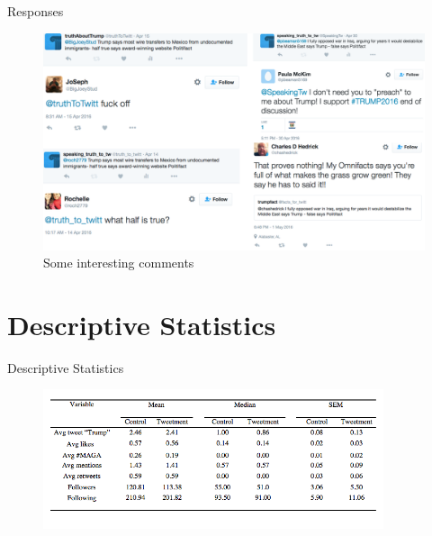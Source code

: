 \documentclass[10pt]{beamer}\usepackage[]{graphicx}\usepackage[]{color}
\begin{document}
\begin{frame}{Responses}
		\begin{figure}
			\begin{centering}
  	\includegraphics[scale=.45]{twitter_comment.PNG}
  \caption{Some interesting comments}
			\end{centering}
		\end{figure}
\end{frame}


\section{Descriptive Statistics}
\begin{frame}{Descriptive Statistics}


\begin{figure}
\includegraphics[width=10cm]{../tables/descriptive.png}
\end{figure}

% 
\end{frame}
\end{document}
